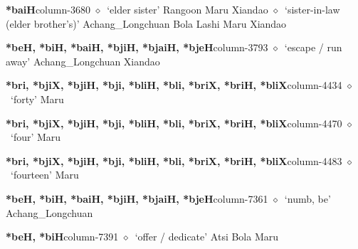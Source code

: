  \item {\footnotesize \textbf{*baiH}}{\tiny column-3680}
         $\diamond$~`elder sister'
         Rangoon 
\hspace{1ex}
         Maru 
\hspace{1ex}
         Xiandao 
\hspace{1ex}
         $\diamond$~`sister-in-law (elder brother's)'
         Achang\_Longchuan 
\hspace{1ex}
         Bola 
\hspace{1ex}
         Lashi 
\hspace{1ex}
         Maru 
\hspace{1ex}
         Xiandao 
  \item {\footnotesize \textbf{*beH, *biH, *baiH, *bjiH, *bjaiH, *bjeH}}{\tiny column-3793}
         $\diamond$~`escape / run away'
         Achang\_Longchuan 
\hspace{1ex}
         Xiandao 
  \item {\footnotesize \textbf{*bri, *bjiX, *bjiH, *bji, *bliH, *bli, *briX, *briH, *bliX}}{\tiny column-4434}
         $\diamond$~`forty'
         Maru 
  \item {\footnotesize \textbf{*bri, *bjiX, *bjiH, *bji, *bliH, *bli, *briX, *briH, *bliX}}{\tiny column-4470}
         $\diamond$~`four'
         Maru 
  \item {\footnotesize \textbf{*bri, *bjiX, *bjiH, *bji, *bliH, *bli, *briX, *briH, *bliX}}{\tiny column-4483}
         $\diamond$~`fourteen'
         Maru 
  \item {\footnotesize \textbf{*beH, *biH, *baiH, *bjiH, *bjaiH, *bjeH}}{\tiny column-7361}
         $\diamond$~`numb, be'
         Achang\_Longchuan 
  \item {\footnotesize \textbf{*beH, *biH}}{\tiny column-7391}
         $\diamond$~`offer / dedicate'
         Atsi 
\hspace{1ex}
         Bola 
\hspace{1ex}
         Maru 
